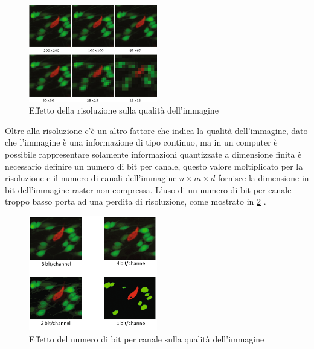 \begin{figure}[ht]
    \centering
    \includegraphics[width=0.5\textwidth]{frame/resolution-on-image-quality.png}
    \caption{Effetto della risoluzione sulla qualità dell'immagine}
    \label{fig:resolution-on-image-quality}
\end{figure}

Oltre alla risoluzione c'è un altro fattore che indica la qualità dell'immagine, dato che l'immagine è una informazione di tipo continuo, ma in un computer è possibile rappresentare solamente informazioni quantizzate a dimensione finita è necessario definire un numero di bit per canale, questo valore moltiplicato per la risoluzione e il numero di canali dell'immagine  \(n\times m \times d\) fornisce la dimensione in bit dell'immagine raster non compressa. L'uso di un numero di bit per canale  troppo basso porta ad una perdita di risoluzione, come mostrato in \cref{fig:bit-channel}  \cite{gonzalez_dip} \cite{spaepen_resolution}.

\begin{figure}[ht]
    \centering
    \includegraphics[width=0.5\textwidth]{frame/bit-channel.png}
    \caption{Effetto del numero di bit per canale sulla qualità dell'immagine}
    \label{fig:bit-channel}
\end{figure}





